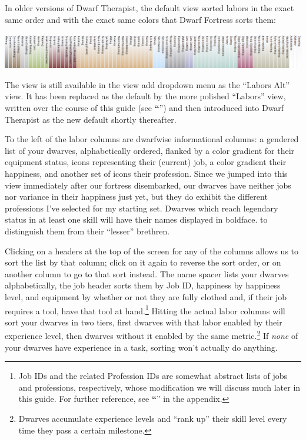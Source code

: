 \documentclass[]{article}
\newcommand{\jump}[1] {\textbf{``\nameref{sec:#1}}''}
\newcommand{\legacy}[1] {
\begin{center}
\colorbox{legacy-content}{
\begin{minipage}[t]{0.95\linewidth}
#1
\end{minipage}
}
\end{center}
}
\begin{document}
\legacy{

In older versions of Dwarf Therapist, the default view sorted labors in the exact
same order and with the exact same colors that Dwarf Fortress sorts them:

\vspace{12pt}
\includegraphics[width=\linewidth]{Sec1Fig6}
\vspace{2pt}

The view is still available in the view add dropdown menu as the ``Labors Alt'' view. It has been
replaced as the default by the more polished ``Labors'' view, written over the course of this guide
(see \jump{Custom Grid Views}) and then introduced into Dwarf Therapist as the new default shortly
thereafter.

}

To the left of the labor columns are dwarfwise informational columns: a gendered list of your dwarves,
alphabetically ordered, flanked by a color gradient for their equipment status, icons representing their
(current) job, a color gradient their happiness, and another set of icons their profession. Since we
jumped into this view immediately after our fortress disembarked, our dwarves have neither jobs nor
variance in their happiness just yet, but they do exhibit the different professions I've selected for my
starting set. Dwarves which reach legendary status in at least one skill will have their names displayed
in boldface. to distinguish them from their ``lesser'' brethren.

Clicking on a headers at the top of the screen for any of the columns allows us to sort the list by that
column; click on it again to reverse the sort order, or on another column to go to that sort instead.
The name spacer lists your dwarves alphabetically, the job header sorts them by Job ID, happiness by
happiness level, and equipment by whether or not they are fully clothed and,
if their job requires a tool, have that tool at hand.\footnote{\label{footnote} Job IDs and
the related Profession IDs are somewhat abstract lists of jobs and professions, respectively, whose
modification we will discuss much later in this guide. For further reference, see \jump{Profession IDs}
in the appendix.} Hitting the actual labor columns will sort your dwarves in two tiers, first dwarves
with that labor enabled by their experience level, then dwarves without it enabled by the same
metric.\footnote{Dwarves accumulate experience levels and ``rank up'' their skill level every time they
pass a certain milestone.} If \emph{none} of your dwarves have experience in a task, sorting won't
actually do anything.
\end{document}

